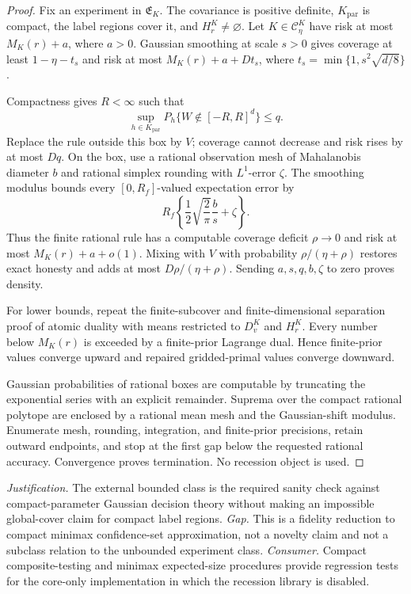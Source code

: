 \documentclass{article}
\begin{document}
\begin{proof}
Fix an experiment in \(\mathfrak E_K\). The covariance is positive definite, \(K_{\mathrm{par}}\) is compact, the label regions cover it, and \(H_r^K\ne\varnothing\). Let \(K\in\mathcal C_\eta^K\) have risk at most \(M_K(r)+a\), where \(a>0\). Gaussian smoothing at scale \(s>0\) gives coverage at least \(1-\eta-t_s\) and risk at most \(M_K(r)+a+Dt_s\), where \(t_s=\min\{1,s^2\sqrt{d/8}\}\).

Compactness gives \(R<\infty\) such that
\[
 \sup_{h\in K_{\mathrm{par}}}P_h\{W\notin[-R,R]^d\}\le q.
\]
Replace the rule outside this box by \(V\); coverage cannot decrease and risk rises by at most \(Dq\). On the box, use a rational observation mesh of Mahalanobis diameter \(b\) and rational simplex rounding with \(L^1\)-error \(\zeta\). The smoothing modulus bounds every \([0,R_f]\)-valued expectation error by
\[
 R_f\left\{\frac12\sqrt{\frac2\pi}\frac b s+\zeta\right\}.
\]
Thus the finite rational rule has a computable coverage deficit \(\rho\to0\) and risk at most \(M_K(r)+a+o(1)\). Mixing with \(V\) with probability \(\rho/(\eta+\rho)\) restores exact honesty and adds at most \(D\rho/(\eta+\rho)\). Sending \(a,s,q,b,\zeta\) to zero proves density.

For lower bounds, repeat the finite-subcover and finite-dimensional separation proof of atomic duality with means restricted to \(D_v^K\) and \(H_r^K\). Every number below \(M_K(r)\) is exceeded by a finite-prior Lagrange dual. Hence finite-prior values converge upward and repaired gridded-primal values converge downward.

Gaussian probabilities of rational boxes are computable by truncating the exponential series with an explicit remainder. Suprema over the compact rational polytope are enclosed by a rational mean mesh and the Gaussian-shift modulus. Enumerate mesh, rounding, integration, and finite-prior precisions, retain outward endpoints, and stop at the first gap below the requested rational accuracy. Convergence proves termination. No recession object is used.
\end{proof}
\par\smallskip\noindent \textit{Justification.} The external bounded class is the required sanity check against compact-parameter Gaussian decision theory without making an impossible global-cover claim for compact label regions. \textit{Gap.} This is a fidelity reduction to compact minimax confidence-set approximation, not a novelty claim and not a subclass relation to the unbounded experiment class. \textit{Consumer.} Compact composite-testing and minimax expected-size procedures provide regression tests for the core-only implementation in which the recession library is disabled.
\end{document}
